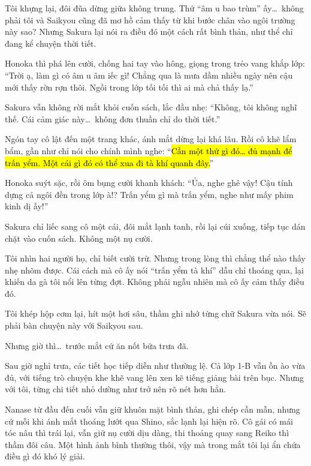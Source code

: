 \documentclass[../main.tex]{subfiles}
\begin{document}
Tôi khựng lại, đôi đũa dừng giữa không trung. Thứ ``âm u bao trùm'' ấy\dots\ không phải tôi và Saikyou cũng đã mơ hồ cảm thấy từ khi bước chân vào ngôi trường này sao? Nhưng Sakura lại nói ra điều đó một cách rất bình thản, như thể chỉ đang kể chuyện thời tiết.

Honoka thì phá lên cười, chống hai tay vào hông, giọng trong trẻo vang khắp lớp: ``Trời ạ, làm gì có âm u âm iếc gì! Chẳng qua là mưa dầm nhiều ngày nên cậu mới thấy rờn rợn thôi. Ngồi trong lớp tối tối thì ai mà chả thấy lạ.''

Sakura vẫn không rời mắt khỏi cuốn sách, lắc đầu nhẹ: ``Không, tôi không nghĩ thế. Cái cảm giác này\dots\ không đơn thuần chỉ do thời tiết.''

Ngón tay cô lật đến một trang khác, ánh mắt dừng lại khá lâu. Rồi cô khẽ lẩm bẩm, gần như chỉ nói cho chính mình nghe: ``\hl{Cần một thứ gì đó\dots{} đủ mạnh để trấn yểm. Một cái gì đó có thể xua đi tà khí quanh đây.}''

Honoka suýt sặc, rồi ôm bụng cười khanh khách: ``Ủa, nghe ghê vậy! Cậu tính dựng cả ngôi đền trong lớp à!? Trấn yểm gì mà trấn yểm, nghe như mấy phim kinh dị ấy!''

Sakura chỉ liếc sang cô một cái, đôi mắt lạnh tanh, rồi lại cúi xuống, tiếp tục dán chặt vào cuốn sách. Không một nụ cười.

Tôi nhìn hai người họ, chỉ biết cười trừ. Nhưng trong lòng thì chẳng thể nào thấy nhẹ nhõm được. Cái cách mà cô ấy nói ``trấn yểm tà khí'' dẫu chỉ thoáng qua, lại khiến da gà tôi nổi lên từng đợt. Không phải ngẫu nhiên mà cô ấy cảm thấy điều đó.

Tôi khép hộp cơm lại, hít một hơi sâu, thầm ghi nhớ từng chữ Sakura vừa nói. Sẽ phải bàn chuyện này với Saikyou sau.

Nhưng giờ thì\dots\ trước mắt cứ ăn nốt bữa trưa đã.

\ct

Sau giờ nghỉ trưa, các tiết học tiếp diễn như thường lệ. Cả lớp 1-B vẫn ồn ào vừa đủ, với tiếng trò chuyện khe khẽ vang lên xen kẽ tiếng giảng bài trên bục. Nhưng với tôi, từng chi tiết nhỏ dường như trở nên rõ nét hơn hẳn.

Nanase từ đầu đến cuối vẫn giữ khuôn mặt bình thản, ghi chép cần mẫn, nhưng cứ mỗi khi ánh mắt thoáng lướt qua Shino, sắc lạnh lại hiện rõ. Cô gái có mái tóc nâu thì trái lại, vẫn giữ nụ cười dịu dàng, thi thoảng quay sang Reiko thì thầm đôi câu. Một hình ảnh bình thường thôi, vậy mà trong mắt tôi lại ẩn chứa điều gì đó khó lý giải.
\end{document}
